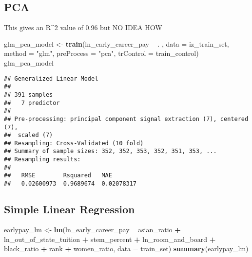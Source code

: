 \documentclass[
]{article}
\newenvironment{Shaded}{\begin{snugshade}}{\end{snugshade}}
\newcommand{\DataTypeTok}[1]{\textcolor[rgb]{0.13,0.29,0.53}{#1}}
\newcommand{\KeywordTok}[1]{\textcolor[rgb]{0.13,0.29,0.53}{\textbf{#1}}}
\newcommand{\NormalTok}[1]{#1}
\newcommand{\OperatorTok}[1]{\textcolor[rgb]{0.81,0.36,0.00}{\textbf{#1}}}
\newcommand{\StringTok}[1]{\textcolor[rgb]{0.31,0.60,0.02}{#1}}
\begin{document}
\hypertarget{pca}{%
\subsection{PCA}\label{pca}}

This gives an R\^{}2 value of 0.96 but NO IDEA HOW

\begin{Shaded}
\begin{Highlighting}[]
\NormalTok{glm_pca_model <-}\StringTok{ }\KeywordTok{train}\NormalTok{(ln_early_career_pay }\OperatorTok{~}\StringTok{ }\NormalTok{. , }
                 \DataTypeTok{data =}\NormalTok{ iz_train_set, }
                 \DataTypeTok{method =} \StringTok{"glm"}\NormalTok{, }
                 \DataTypeTok{preProcess =} \StringTok{"pca"}\NormalTok{, }
                 \DataTypeTok{trControl =}\NormalTok{ train_control)}
\NormalTok{glm_pca_model}
\end{Highlighting}
\end{Shaded}

\begin{verbatim}
## Generalized Linear Model 
## 
## 391 samples
##   7 predictor
## 
## Pre-processing: principal component signal extraction (7), centered (7),
##  scaled (7) 
## Resampling: Cross-Validated (10 fold) 
## Summary of sample sizes: 352, 352, 353, 352, 351, 353, ... 
## Resampling results:
## 
##   RMSE        Rsquared   MAE       
##   0.02600973  0.9689674  0.02078317
\end{verbatim}

\hypertarget{simple-linear-regression}{%
\subsection{Simple Linear Regression}\label{simple-linear-regression}}

\begin{Shaded}
\begin{Highlighting}[]
\NormalTok{earlypay_lm <-}\StringTok{ }\KeywordTok{lm}\NormalTok{(ln_early_career_pay }\OperatorTok{~}\StringTok{  }\NormalTok{asian_ratio }\OperatorTok{+}\StringTok{ }
\StringTok{                    }\NormalTok{ln_out_of_state_tuition }\OperatorTok{+}\StringTok{ }
\StringTok{                    }\NormalTok{stem_percent }\OperatorTok{+}\StringTok{ }
\StringTok{                    }\NormalTok{ln_room_and_board }\OperatorTok{+}\StringTok{ }
\StringTok{                    }\NormalTok{black_ratio }\OperatorTok{+}\StringTok{ }
\StringTok{                    }\NormalTok{rank }\OperatorTok{+}\StringTok{ }
\StringTok{                    }\NormalTok{women_ratio, }
                  \DataTypeTok{data =}\NormalTok{ train_set)}
\KeywordTok{summary}\NormalTok{(earlypay_lm)}
\end{Highlighting}
\end{Shaded}
\end{document}
